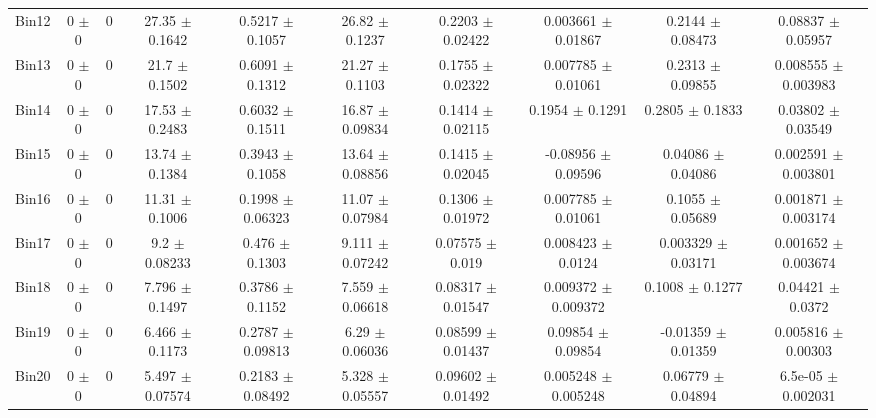 \begin{tabular}{@{\extracolsep{4pt}}lccccccccc@{}}
     Bin12 & 0 $\pm$ 0 & 0 & 27.35 $\pm$ 0.1642 & 0.5217 $\pm$ 0.1057 & 26.82 $\pm$ 0.1237 & 0.2203 $\pm$ 0.02422 & 0.003661 $\pm$ 0.01867 & 0.2144 $\pm$ 0.08473 & 0.08837 $\pm$ 0.05957 \\ 
     Bin13 & 0 $\pm$ 0 & 0 & 21.7 $\pm$ 0.1502 & 0.6091 $\pm$ 0.1312 & 21.27 $\pm$ 0.1103 & 0.1755 $\pm$ 0.02322 & 0.007785 $\pm$ 0.01061 & 0.2313 $\pm$ 0.09855 & 0.008555 $\pm$ 0.003983 \\ 
     Bin14 & 0 $\pm$ 0 & 0 & 17.53 $\pm$ 0.2483 & 0.6032 $\pm$ 0.1511 & 16.87 $\pm$ 0.09834 & 0.1414 $\pm$ 0.02115 & 0.1954 $\pm$ 0.1291 & 0.2805 $\pm$ 0.1833 & 0.03802 $\pm$ 0.03549 \\ 
     Bin15 & 0 $\pm$ 0 & 0 & 13.74 $\pm$ 0.1384 & 0.3943 $\pm$ 0.1058 & 13.64 $\pm$ 0.08856 & 0.1415 $\pm$ 0.02045 & -0.08956 $\pm$ 0.09596 & 0.04086 $\pm$ 0.04086 & 0.002591 $\pm$ 0.003801 \\ 
     Bin16 & 0 $\pm$ 0 & 0 & 11.31 $\pm$ 0.1006 & 0.1998 $\pm$ 0.06323 & 11.07 $\pm$ 0.07984 & 0.1306 $\pm$ 0.01972 & 0.007785 $\pm$ 0.01061 & 0.1055 $\pm$ 0.05689 & 0.001871 $\pm$ 0.003174 \\ 
     Bin17 & 0 $\pm$ 0 & 0 & 9.2 $\pm$ 0.08233 & 0.476 $\pm$ 0.1303 & 9.111 $\pm$ 0.07242 & 0.07575 $\pm$ 0.019 & 0.008423 $\pm$ 0.0124 & 0.003329 $\pm$ 0.03171 & 0.001652 $\pm$ 0.003674 \\ 
     Bin18 & 0 $\pm$ 0 & 0 & 7.796 $\pm$ 0.1497 & 0.3786 $\pm$ 0.1152 & 7.559 $\pm$ 0.06618 & 0.08317 $\pm$ 0.01547 & 0.009372 $\pm$ 0.009372 & 0.1008 $\pm$ 0.1277 & 0.04421 $\pm$ 0.0372 \\ 
     Bin19 & 0 $\pm$ 0 & 0 & 6.466 $\pm$ 0.1173 & 0.2787 $\pm$ 0.09813 & 6.29 $\pm$ 0.06036 & 0.08599 $\pm$ 0.01437 & 0.09854 $\pm$ 0.09854 & -0.01359 $\pm$ 0.01359 & 0.005816 $\pm$ 0.00303 \\ 
     Bin20 & 0 $\pm$ 0 & 0 & 5.497 $\pm$ 0.07574 & 0.2183 $\pm$ 0.08492 & 5.328 $\pm$ 0.05557 & 0.09602 $\pm$ 0.01492 & 0.005248 $\pm$ 0.005248 & 0.06779 $\pm$ 0.04894 & 6.5e-05 $\pm$ 0.002031 \\ 
\hline\hline
  \end{tabular}
